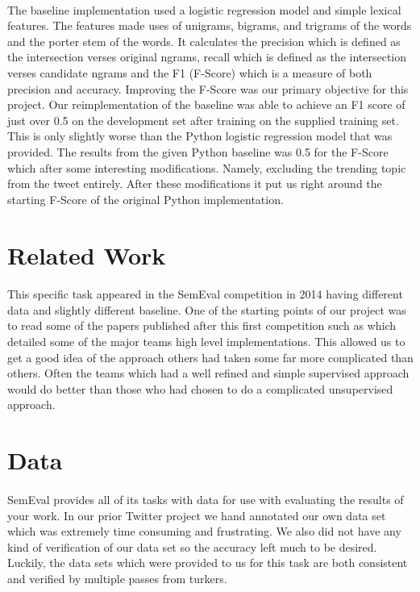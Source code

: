 \documentclass[11pt,letterpaper]{article}
\begin{document}
\paragraph{}
The baseline implementation used a logistic regression model and simple lexical features. The features made uses of unigrams, bigrams, and trigrams of the words and the porter stem of the words. It calculates the precision which is defined as the intersection verses original ngrams, recall which is defined as the intersection verses candidate ngrams and the F1 (F-Score) which is a measure of both precision and accuracy. Improving the F-Score was our primary objective for this project. Our reimplementation of the baseline was able to achieve an F1 score of just over 0.5 on the development set after training on the supplied training set. This is only slightly worse than the Python logistic regression model that was provided. The results from the given Python baseline was 0.5 for the F-Score which after some interesting modifications. Namely, excluding the trending topic from the tweet entirely. After these modifications it put us right around the starting F-Score of the original Python implementation.


\section{Related Work}
\paragraph{}
This specific task appeared in the SemEval competition in 2014 having different data and slightly different baseline. One of the starting points of our project was to read some of the papers published after this first competition such as \cite{Divergent-Paraphrases} which detailed some of the major teams high level implementations. This allowed us to get a good idea of the approach others had taken some far more complicated than others. Often the teams which had a well refined and simple supervised approach would do better than those who had chosen to do a complicated unsupervised approach.


\section{Data}
\paragraph{}
SemEval provides all of its tasks with data for use with evaluating the results of your work. In our prior Twitter project we hand annotated our own data set which was extremely time consuming and frustrating. We also did not have any kind of verification of our data set so the accuracy left much to be desired. Luckily, the data sets which were provided to us for this task are both consistent and verified by multiple passes from turkers.
\end{document}
